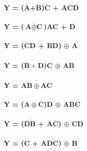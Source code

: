 \documentclass[a4paper, 100pt]{scrartcl}
\begin{document}
	
	\textbf{Y = ($\overline{\textbf{A}}$+B)C + $\overline{\textbf{ACD}}$} 
	\\
	\\
	\textbf{Y = ($\overline{\textbf{A} \oplus\textbf{C}}$)\textbf{AC} + $\overline{\textbf{D}}$} 
	\\
	\\
	\textbf{Y = ($\overline{\textbf{C}}$D + \textbf{BD}) $\oplus$ A}
	\\
	\\
	\textbf{Y = ($\overline{\overline{\textbf{B}}+\textbf{D}}$)C $\oplus$ AB}
	\\
	\\
	\textbf{Y = $\overline{\overline{\textbf{AB}}\oplus \textbf{AC}}$}
	\\
	\\
	\textbf{Y = ($\overline{\textbf{A}}\oplus\overline{\textbf{C}}$)D $\oplus$ ABC}
	\\
	\\
	\textbf{Y = ($\overline{\overline{\textbf{D}}\textbf{B}}$ + A$\overline{\textbf{C}}$) $\oplus$ CD}
	\\
	\\
	\textbf{Y = (C + A$\overline{\textbf{DC}}$) $\oplus$ B}
\end{document}
